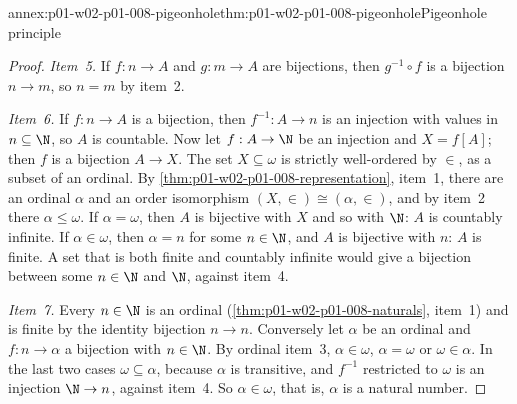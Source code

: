 \begin{annexitem}{annex:p01-w02-p01-008-pigeonhole}{thm:p01-w02-p01-008-pigeonhole}{Pigeonhole principle}
\begin{proof}
\emph{Item~5.} If \(f:n\to A\) and \(g:m\to A\) are bijections, then
\(g^{-1}\circ f\) is a bijection \(n\to m\), so \(n=m\) by item~2.

\emph{Item~6.} If \(f:n\to A\) is a bijection, then \(f^{-1}:A\to n\) is an
injection with values in \(n\subseteq\N\), so \(A\) is countable. Now let
\(f:A\to\N\) be an injection and \(X=f[A]\); then \(f\) is a bijection
\(A\to X\). The set \(X\subseteq\omega\) is strictly well-ordered by
\(\in\), as a subset of an ordinal. By
\cref{thm:p01-w02-p01-008-representation}, item~1, there are an ordinal
\(\alpha\) and an order isomorphism \((X,\in)\cong(\alpha,\in)\), and by
item~2 there \(\alpha\leq\omega\). If \(\alpha=\omega\), then \(A\) is
bijective with \(X\) and so with \(\N\): \(A\) is countably infinite. If
\(\alpha\in\omega\), then \(\alpha=n\) for some \(n\in\N\), and \(A\) is
bijective with \(n\): \(A\) is finite. A set that is both finite and
countably infinite would give a bijection between some \(n\in\N\) and
\(\N\), against item~4.

\emph{Item~7.} Every \(n\in\N\) is an ordinal
(\cref{thm:p01-w02-p01-008-naturals}, item~1) and is finite by the identity
bijection \(n\to n\). Conversely let \(\alpha\) be an ordinal and
\(f:n\to\alpha\) a bijection with \(n\in\N\). By ordinal item~3,
\(\alpha\in\omega\), \(\alpha=\omega\) or \(\omega\in\alpha\). In the last
two cases \(\omega\subseteq\alpha\), because \(\alpha\) is transitive, and
\(f^{-1}\) restricted to \(\omega\) is an injection \(\N\to n\), against
item~4. So \(\alpha\in\omega\), that is, \(\alpha\) is a natural number.
\end{proof}
\end{annexitem}


